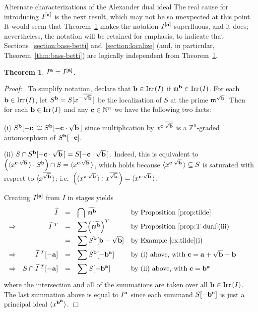 \documentclass[12pt,leqno]{article}
\newtheorem{thm}{Theorem}[section]
\def\<{{\langle}}
\def\>{{\rangle}}
\def\Irr{{\rm Irr}{\scriptscriptstyle \,}}
\def\aa{{{\rm \bf a}}}
\def\bb{{{\rm \bf b}}}
\def\cc{{{\rm \bf c}}}
\def\mm{{\mathfrak m}}
\def\NN{{\mathbb N}}
\def\ZZ{{\mathbb Z}}
\begin{document}
\begin{section}{Alternate characterizations of the Alexander dual ideal}
The real cause for introducing $I^{[\aa]}$ is the next result, which may
not be so unexpected at this point.  It would seem that
Theorem~\ref{thm:[a]=a} makes the notation $I^{[\aa]}$ superfluous, and
it does; nevertheless, the notation will be retained for emphasis, to
indicate that Sections~\ref{section:bass-betti}
and~\ref{section:localize} (and, in particular,
Theorem~\ref{thm:bass-betti}) are logically independent from
Theorem~\ref{thm:[a]=a}.
\begin{thm} \label{thm:[a]=a}
$I^\aa = I^{[\aa]}$.
\end{thm}
{\it Proof:\ } To simplify notation, declare that $\bb \in \Irr(I)$ if
$\mm^\bb \in \Irr(I)$.  For each $\bb \in \Irr(I)$, let $S^\bb =
S[x^{\,\mbox{--}\,\overline{\sqrt{\bb}}\,}]$ be the localization of $S$
at the prime $\mm^{\sqrt{\bb}}$.  Then for each $\bb \in \Irr(I)$ and any
$\cc \in \NN^n$ we have the following two facts:

\noindent
(i) $S^\bb[-\cc] \cong S^\bb[-\cc \cdot \sqrt{\bb}^{\,}]$ since
multiplication by $x^{\cc \cdot \overline{\sqrt{\bb}}}$ is a
$\ZZ^n$-graded automorphism of $S^\bb[-\cc]$.

\vskip 1mm \noindent
(ii) $S \cap S^\bb[-\cc \cdot \sqrt{\bb}^{\,}] = S[-\cc \cdot
\sqrt{\bb}^{\,}]$.  Indeed, this is equivalent to $\Bigl(\<x^{\cc \cdot
\sqrt{\bb}\,}\> \cdot S^\bb\Bigr) \cap S = \<x^{\cc \cdot
\sqrt{\bb}\,}\>$, which holds because $\<x^{\cc \cdot \sqrt{\bb}\,}\>
\subseteq S$ is saturated with respect to
$\<x^{\overline{\sqrt{\bb}}\,}\>$; i.e.\ $\Bigl(\<x^{\cc \cdot
\sqrt{\bb}\,}\> : x^{\overline{\sqrt{\bb}}\,}\Bigr) = \<x^{\cc \cdot
\sqrt{\bb}\,}\>$.

\vskip 1mm
Creating $I^{[\aa]}$ from $I$ in stages yields
$$
\begin{array}{rr@{\quad =\quad }ll}
&
\widetilde{I}
&	\displaystyle \bigcap\,\widetilde{\mm^{\bb}}
&	\hbox{by Proposition~\ref{prop:tilde}}\phantom{\Bigl(\Bigr)}
\cr
\Rightarrow
&
\widetilde{I}^{\;T}
&	\displaystyle \sum \Bigl(\widetilde{\mm^\bb}\Bigr)^T
&	\hbox{by Proposition~\ref{prop:T-dual}(iii)}
\cr
&
&	\displaystyle \sum S^\bb[\bb - \sqrt\bb]
&	\hbox{by Example~\ref{ex:tilde}(i)}\phantom{\Bigl(\Bigr)^T}
\cr
\Rightarrow
&
\widetilde{I}^{\;T}[-\aa]
&	\displaystyle \sum S^\bb[-\bb^\aa]
&	\hbox{by (i) above, with}\ \cc = \aa + \sqrt\bb - \bb
		\phantom{\Bigl(\Bigr)^T}
\cr
\Rightarrow
&
S \cap \widetilde{I}^{\;T}[-\aa]
&	\displaystyle \sum S[-\bb^\aa]
&	\hbox{by (ii) above, with}\ \cc = \bb^\aa
		\phantom{\Bigl(\Bigr)^T}
\cr
\end{array}
$$
where the intersection and all of the summations are taken over all $\bb
\in \Irr(I)$.  The last summation above is equal to $I^\aa$ since each
summand $S[-\bb^\aa]$ is just a principal ideal $\<x^{\bb^{\scriptstyle
\aa}}\>$.
%
\hfill
$\Box$


\end{section}
\end{document}
